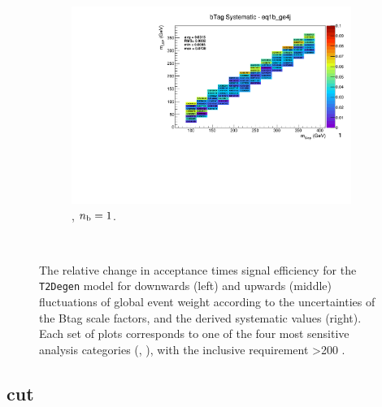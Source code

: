 \begin{figure}[ht!]
\begin{subfigure}[b]{0.32\textwidth}
    \includegraphics[width=\textwidth, page=1]{Figs/sms/t2degen/v19/systs_v2/T2_4body_bTag_eq1b_ge4j.pdf}
    \caption{\njhigh, $n_{\text{b}} = 1$.}
  \end{subfigure}\\
  \caption{The relative change in acceptance times signal efficiency for the
  \texttt{T2Degen} model for downwards (left) and upwards (middle) fluctuations
  of global event weight according to the uncertainties of the Btag scale 
  factors,
  and the derived systematic values (right). Each set of plots corresponds
  to one of the four most sensitive analysis categories (\nb, \nj), with the
  inclusive requirement \HT>200 \gev.}
  \label{fig:sms-btag-t2degen}
\end{figure}


\newpage
\subsection*{\mhtmet cut}
\label{sec:t2degen_mhtmet_plots}

